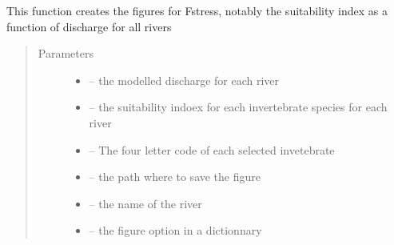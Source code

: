 \documentclass[letterpaper,10pt,english]{sphinxmanual}
\begin{document}
\begin{fulllineitems}
\label{\detokenize{index:src.fstress.figure_fstress}}
This function creates the figures for Fstress, notably the suitability index as a function of discharge for all
rivers
\begin{quote}\begin{description}
\item[{Parameters}] \leavevmode\begin{itemize}
\item {} 
 -- the modelled discharge for each river

\item {} 
 -- the suitability indoex for each invertebrate species for each river

\item {} 
 -- The four letter code of each selected invetebrate

\item {} 
 -- the path where to save the figure

\item {} 
 -- the name of the river

\item {} 
 -- the figure option in a dictionnary

\end{itemize}

\end{description}\end{quote}

\end{fulllineitems}

\end{document}
